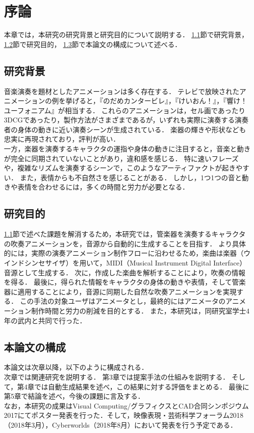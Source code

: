 \chapter{序論}
\label{chap:intro}

本章では，本研究の研究背景と研究目的について説明する．
\ref{sec:background}節で研究背景，
\ref{sec:purpose}節で研究目的，
\ref{sec:structure}節で本論文の構成について述べる．

\section{研究背景}\label{sec:background}
\indent
音楽演奏を題材としたアニメーションは多く存在する．
テレビで放映されたアニメーションの例を挙げると，『のだめカンタービレ』，『けいおん！』，『響け！ユーフォニアム』が相当する．
これらのアニメーションは，セル画であったり3DCGであったり，製作方法がさまざまであるが，いずれも実際に演奏する演奏者の身体の動きに近い演奏シーンが生成されている．
楽器の輝きや形状なども忠実に再現されており，評判が高い．\\
\indent
一方，楽器を演奏するキャラクタの運指や身体の動きに注目すると，音楽と動きが完全に同期されていないことがあり，違和感を感じる．
特に速いフレーズや，複雑なリズムを演奏するシーンで，このようなアーティファクトが起きやすい．
また，表情からも不自然さを感じることがある．
しかし，1つ1つの音と動きや表情を合わせるには，多くの時間と労力が必要となる．

\section{研究目的}\label{sec:purpose}
\indent
\ref{sec:background}節で述べた課題を解消するため，本研究では，管楽器を演奏するキャラクタの吹奏アニメーションを，音源から自動的に生成することを目指す．
より具体的には，実際の演奏アニメーション制作フローに沿わせるため，楽曲は楽器（ウインドシンセサイザ）を用いて，MIDI（Musical Instrument Digital Interface）音源として生成する．
次に，作成した楽曲を解析することにより，吹奏の情報を得る．
最後に，得られた情報をキャラクタの身体の動きや表情，そして管楽器に適用することにより，音源に同期した自然な吹奏アニメーションを実現する．
この手法の対象ユーザはアニメータとし，最終的にはアニメータのアニメーション制作時間と労力の削減を目的とする．
また，本研究は，同研究室学士4年の武内と共同で行った．

\section{本論文の構成}\label{sec:structure}
本論文は次章以降，以下のように構成される．\\
\indent
次章では関連研究を説明する．
第3章では提案手法の仕組みを説明する．
そして，第4章では自動生成結果を述べ，この結果に対する評価をまとめる．
最後に第5章で結論を述べ，今後の課題に言及する．\\
\indent
なお，本研究の成果はVisual Computing/グラフィクスとCAD合同シンポジウム2017にてポスター発表\cite{vc}を行った．そして，映像表現・芸術科学フォーラム2018（2018年3月），Cyberworlds（2018年8月）において発表を行う予定である．
